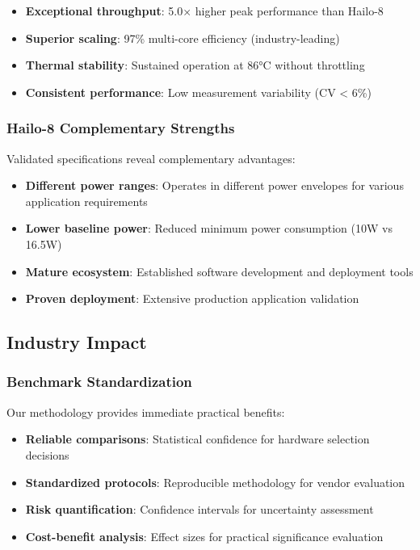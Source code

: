 \documentclass[manuscript]{acmart}
\begin{document}
\begin{itemize}
    \item \textbf{Exceptional throughput}: 5.0× higher peak performance than Hailo-8
    \item \textbf{Superior scaling}: 97\% multi-core efficiency (industry-leading)
    \item \textbf{Thermal stability}: Sustained operation at 86°C without throttling
    \item \textbf{Consistent performance}: Low measurement variability (CV < 6\%)
\end{itemize}

\subsubsection{Hailo-8 Complementary Strengths}
Validated specifications reveal complementary advantages:

\begin{itemize}
    \item \textbf{Different power ranges}: Operates in different power envelopes for various application requirements
    \item \textbf{Lower baseline power}: Reduced minimum power consumption (10W vs 16.5W)
    \item \textbf{Mature ecosystem}: Established software development and deployment tools
    \item \textbf{Proven deployment}: Extensive production application validation
\end{itemize}

\subsection{Industry Impact}

\subsubsection{Benchmark Standardization}
Our methodology provides immediate practical benefits:

\begin{itemize}
    \item \textbf{Reliable comparisons}: Statistical confidence for hardware selection decisions
    \item \textbf{Standardized protocols}: Reproducible methodology for vendor evaluation
    \item \textbf{Risk quantification}: Confidence intervals for uncertainty assessment
    \item \textbf{Cost-benefit analysis}: Effect sizes for practical significance evaluation
\end{itemize}
\end{document}
